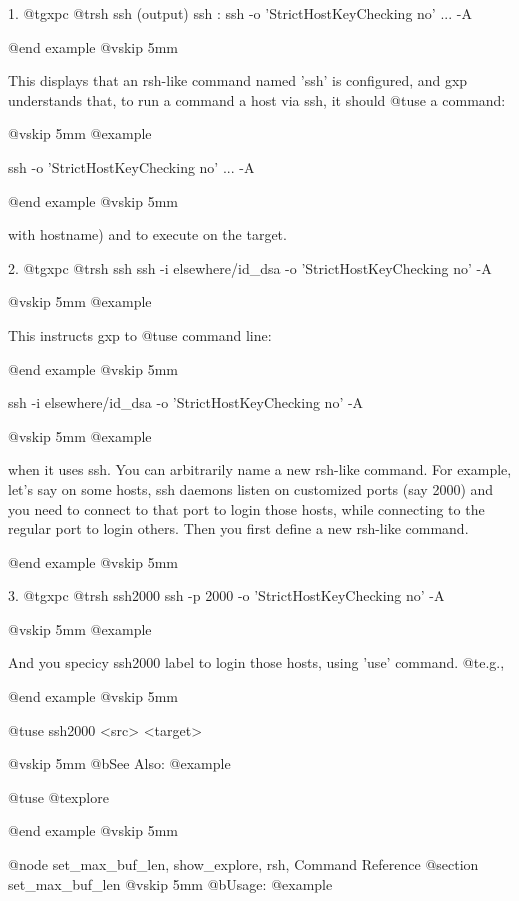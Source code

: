 1.
  @t{gxpc} @t{rsh} ssh
  (output) ssh : ssh -o 'StrictHostKeyChecking no' ... -A %

@end example
@vskip 5mm

  This displays that an rsh-like command named 'ssh' is configured,
  and gxp understands that, to run a command a host via ssh, it should
  @t{use} a command:

@vskip 5mm
@example

         ssh -o 'StrictHostKeyChecking no' ... -A %

@end example
@vskip 5mm

  with %
  hostname) and %
  to execute on the target.
  
2.   
  @t{gxpc} @t{rsh} ssh ssh -i elsewhere/id_dsa -o 'StrictHostKeyChecking no' -A %

@vskip 5mm
@example

  This instructs gxp to @t{use} command line:

@end example
@vskip 5mm

     ssh -i elsewhere/id_dsa -o 'StrictHostKeyChecking no' -A %

@vskip 5mm
@example

  when it uses ssh.  You can arbitrarily name a new rsh-like command. 
  For example, let's say on some hosts, ssh daemons listen on customized 
  ports (say 2000) and you need to connect to that port to login those 
  hosts, while connecting to the regular port to login others. Then you 
  first define a new rsh-like command.

@end example
@vskip 5mm
  
3.
  @t{gxpc} @t{rsh} ssh2000 ssh -p 2000 -o 'StrictHostKeyChecking no' -A %

@vskip 5mm
@example

  And you specicy ssh2000 label to login those hosts, using 'use' command. @t{e}.g.,

@end example
@vskip 5mm

     @t{use} ssh2000 <src> <target>

@vskip 5mm
@b{See Also:}
@example

  @t{use} @t{explore}

@end example
@vskip 5mm


@node set_max_buf_len, show_explore, rsh, Command Reference
@section set_max_buf_len
@vskip 5mm
@b{Usage:}
@example

